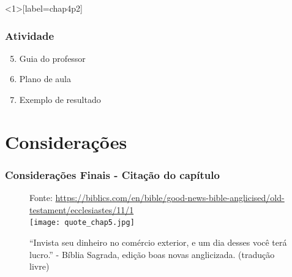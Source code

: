 \documentclass[aspectratio=43,8pt]{beamer}%
\begin{document}
\begin{frame}<1>[label=chap4p2]
	\frametitle{Atividade}
	\begin{keypoint}
		
		\begin{enumerate}
			\setcounter{enumi}{4}
			\item Guia do professor
\pause
			
			\item Plano de aula 
\pause
			
			\item Exemplo de resultado \pause
			 
		\end{enumerate} 
	\end{keypoint}
\end{frame}




\section{Considerações}

\begin{frame}
	\frametitle{Considerações Finais - Citação do capítulo}
	
	\begin{figure}
		\centering
		{\footnotesize Fonte:  \url{https://biblics.com/en/bible/good-news-bible-anglicised/old-testament/ecclesiastes/11/1}}\\
		\texttt{[image: quote\_chap5.jpg]}
		\caption{``Invista seu dinheiro no comércio exterior, e
			um dia desses você terá lucro.'' - Bíblia Sagrada, edição boas novas anglicizada.
			(tradução livre)}
	\end{figure}
\end{frame}
\end{document}
